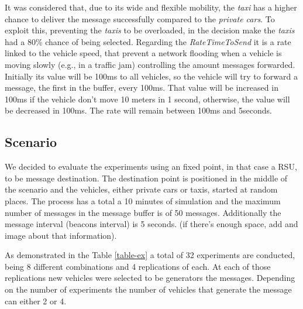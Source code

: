 \documentclass[conference]{IEEEtran}
\begin{document}
It was considered that, due to its wide and flexible mobility, the \emph{taxi} has a higher chance to deliver the message successfully compared to the \emph{private cars}. To exploit this, preventing the \emph{taxis} to be overloaded, in the decision make the \emph{taxis} had a 80\% chance of being selected. Regarding the \emph{RateTimeToSend} it is a rate linked to the vehicle speed, that prevent a network flooding when a vehicle is moving slowly (e.g., in a traffic jam) controlling the amount messages forwarded. Initially its value will be 100ms to all vehicles, so the vehicle will try to forward a message, the first in the buffer, every 100ms. That value will be increased in 100ms if the vehicle don't move 10 meters in 1 second, otherwise, the value will be decreased in 100ms. The rate will remain between 100ms and 5seconds.





\subsection{Scenario}

We decided to evaluate the experiments using an fixed point, in that case a RSU, to be message destination. The destination point is positioned in the middle of the scenario and the vehicles, either private cars or taxis, started at random places. The process has a total a 10 minutes of simulation and the maximum number of messages in the message buffer is of 50 messages. Additionally the message interval (beacons interval) is 5 seconds. (if there's enough space, add and image about that information). 

As demonstrated in the Table \ref{table-ex} a total of 32 experiments are conducted, being 8 different combinations and 4 replications of each. At each of those replications new vehicles were selected to be generators the messages. Depending on the number of experiments the number of vehicles that generate the message can either 2 or 4.
\end{document}
